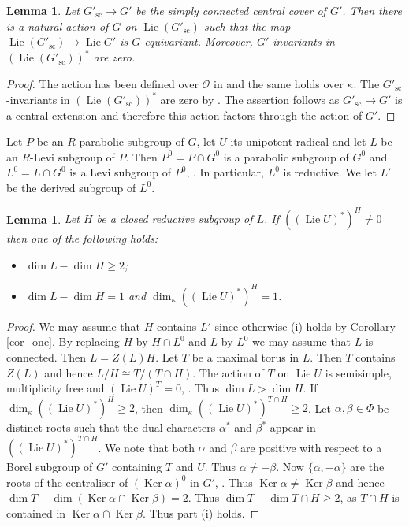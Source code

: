 \documentclass{amsart}
\newtheorem{lem}[prop]{Lemma}
\theoremstyle{definition}
\theoremstyle{remark}
\DeclareMathOperator{\Ker}{Ker}
\newcommand{\OO}{\mathcal O}
\DeclareMathOperator{\Lie}{Lie}
\newcommand{\sic}{\operatorname{sc}}
\begin{document}
\begin{lem}\label{sic} Let $G'_{\sic}\rightarrow G'$ be the simply connected central cover of $G'$. Then there is 
a natural action of $G$ on $\Lie ( G'_{\sic})$ such that the map 
$\Lie ( G'_{\sic})\rightarrow \Lie G'$ is $G$-equivariant. Moreover, $G'$-invariants in 
$(\Lie ( G'_{\sic}))^{\ast}$ are zero. 
\end{lem}

\begin{proof}
    The action has been defined over $\OO$ in  and the same holds over $\kappa$.
    The $G'_{\sic}$-invariants in $(\Lie(G'_{\sic}))^*$ are zero by . 
    The assertion follows as $G'_{\sic} \to G'$ is a central extension and therefore this action factors through the action of $G'$.
\end{proof} 
 

 
 Let $P$ be an $R$-parabolic subgroup of $G$,  let $U$ its unipotent radical and let $L$ be an $R$-Levi subgroup of $P$. Then 
 $P^0= P\cap G^0$ is a parabolic subgroup of $G^0$ and
 $L^0=L\cap G^0$ is a Levi subgroup of $P^0$, \cite[Proposition 5.2]{martin}. In particular, $L^0$
 is reductive. We let $L'$ be the derived subgroup of $L^0$. 
 
 \begin{lem}\label{HL} Let $H$ be a closed reductive subgroup of $L$.
 If $((\Lie U)^*)^H\neq 0$ then one of the following holds:
 \begin{itemize}
 \item[(i)] $\dim L - \dim H \ge 2$;
 \item[(ii)] $\dim L -\dim H =1$ and $\dim_{\kappa} ((\Lie U)^*)^H=1$.
 \end{itemize}
 \end{lem}
 \begin{proof} We may assume that  $H$ contains $L'$ since otherwise (i) holds by Corollary \ref{cor_one}. By replacing $H$ by $H\cap L^0$
 and $L$ by $L^0$ we may assume that $L$ is connected. Then 
 $L=Z(L)H$. Let $T$ be a maximal torus in $L$. Then $T$ contains
 $Z(L)$ and hence $L/H \cong T/(T\cap H)$. The action of $T$ 
 on $\Lie U$ is semisimple, multiplicity free and $(\Lie U)^T=0$, \cite[13.18]{borel}. 
 Thus $\dim L > \dim H$. If $\dim_{\kappa} ((\Lie U)^*)^H\ge 2$, then 
 $\dim_{\kappa} ((\Lie U)^*)^{T\cap H}\ge 2$. Let $\alpha,\beta\in \Phi$ be distinct roots such that the dual characters $\alpha^*$ and 
 $\beta^*$
 appear in $((\Lie U)^*)^{T\cap H}$. We note that both 
 $\alpha$ and $\beta$ are positive with respect to a Borel
 subgroup of $G'$ containing $T$ and $U$. Thus $\alpha\neq -\beta$. Now $\{\alpha, -\alpha\}$ are the roots of
 the centraliser of $(\Ker \alpha)^0$ in $G'$, \cite[13.18(4d)]{borel}. Thus $\Ker \alpha \neq \Ker \beta$
 and hence $\dim T - \dim (\Ker \alpha \cap \Ker \beta) = 2$. Thus $\dim T -\dim T\cap H\ge 2$, as $T\cap H$ is contained in $\Ker \alpha \cap\Ker \beta$. 
 Thus part (i) holds. 
 \end{proof}
 
\end{document}
